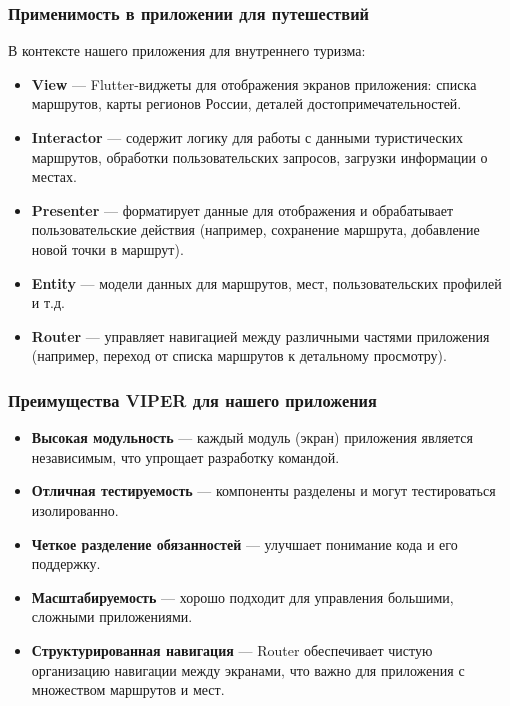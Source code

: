 \subsubsection*{Применимость в приложении для путешествий}

В контексте нашего приложения для внутреннего туризма:

\begin{itemize}
    \item \textbf{View} — Flutter-виджеты для отображения экранов приложения: списка маршрутов, карты регионов России, деталей достопримечательностей.
    \item \textbf{Interactor} — содержит логику для работы с данными туристических маршрутов, обработки пользовательских запросов, загрузки информации о местах.
    \item \textbf{Presenter} — форматирует данные для отображения и обрабатывает пользовательские действия (например, сохранение маршрута, добавление новой точки в маршрут).
    \item \textbf{Entity} — модели данных для маршрутов, мест, пользовательских профилей и т.д.
    \item \textbf{Router} — управляет навигацией между различными частями приложения (например, переход от списка маршрутов к детальному просмотру).
\end{itemize}

\subsubsection*{Преимущества VIPER для нашего приложения}
\begin{itemize}
    \item \textbf{Высокая модульность} — каждый модуль (экран) приложения является независимым, что упрощает разработку командой.
    \item \textbf{Отличная тестируемость} — компоненты разделены и могут тестироваться изолированно.
    \item \textbf{Четкое разделение обязанностей} — улучшает понимание кода и его поддержку.
    \item \textbf{Масштабируемость} — хорошо подходит для управления большими, сложными приложениями.
    \item \textbf{Структурированная навигация} — Router обеспечивает чистую организацию навигации между экранами, что важно для приложения с множеством маршрутов и мест.
\end{itemize}

